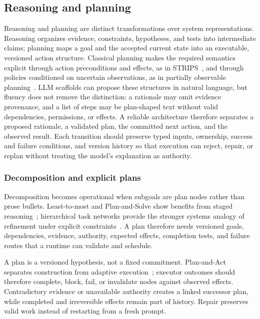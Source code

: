 \subsection{Reasoning and planning}
\label{sec:planning}

Reasoning and planning are distinct transformations over system representations. Reasoning organizes evidence, constraints, hypotheses, and tests into intermediate claims; planning maps a goal and the accepted current state into an executable, versioned action structure. Classical planning makes the required semantics explicit through action preconditions and effects, as in STRIPS~\cite{fikes1971strips}, and through policies conditioned on uncertain observations, as in partially observable planning~\cite{kaelbling1998pomdp}. LLM scaffolds can propose these structures in natural language, but fluency does not remove the distinction: a rationale may omit evidence provenance, and a list of steps may be plan-shaped text without valid dependencies, permissions, or effects. A reliable architecture therefore separates a proposed rationale, a validated plan, the committed next action, and the observed result. Each transition should preserve typed inputs, ownership, success and failure conditions, and version history so that execution can reject, repair, or replan without treating the model's explanation as authority.

\subsubsection{Decomposition and explicit plans}

Decomposition becomes operational when subgoals are plan nodes rather than prose bullets. Least-to-most and Plan-and-Solve show benefits from staged reasoning~\cite{zhou2023leasttomost,wang2023planandsolve}; hierarchical task networks provide the stronger systems analogy of refinement under explicit constraints~\cite{erol1994htn}. A plan therefore needs versioned goals, dependencies, evidence, authority, expected effects, completion tests, and failure routes that a runtime can validate and schedule.

A plan is a versioned hypothesis, not a fixed commitment. Plan-and-Act separates construction from adaptive execution~\cite{erdogan2025planandact}; executor outcomes should therefore complete, block, fail, or invalidate nodes against observed effects. Contradictory evidence or unavailable authority creates a linked successor plan, while completed and irreversible effects remain part of history. Repair preserves valid work instead of restarting from a fresh prompt.

